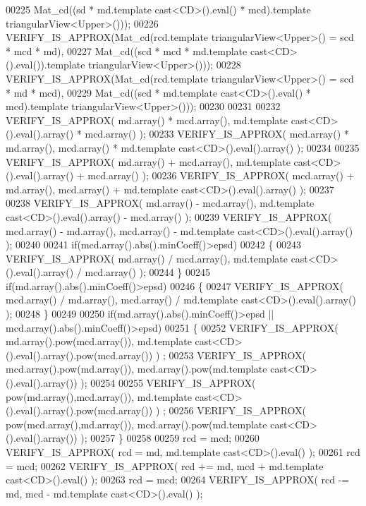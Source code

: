 \begin{DoxyCode}
00225                    Mat\_cd((sd * md.template cast<CD>().eval() * mcd).\textcolor{keyword}{template} triangularView<Upper>()));
00226   VERIFY\_IS\_APPROX(Mat\_cd(rcd.template triangularView<Upper>() = scd * mcd * md),
00227                    Mat\_cd((scd * mcd * md.template cast<CD>().eval()).\textcolor{keyword}{template} triangularView<Upper>()));
00228   VERIFY\_IS\_APPROX(Mat\_cd(rcd.template triangularView<Upper>() = scd * md * mcd),
00229                    Mat\_cd((scd * md.template cast<CD>().eval() * mcd).\textcolor{keyword}{template} triangularView<Upper>()));
00230 
00231 
00232   VERIFY\_IS\_APPROX( md.array()  * mcd.array(), md.template cast<CD>().eval().array() * mcd.array() );
00233   VERIFY\_IS\_APPROX( mcd.array() * md.array(),  mcd.array() * md.template cast<CD>().eval().array() );
00234 
00235   VERIFY\_IS\_APPROX( md.array()  + mcd.array(), md.template cast<CD>().eval().array() + mcd.array() );
00236   VERIFY\_IS\_APPROX( mcd.array() + md.array(),  mcd.array() + md.template cast<CD>().eval().array() );
00237 
00238   VERIFY\_IS\_APPROX( md.array()  - mcd.array(), md.template cast<CD>().eval().array() - mcd.array() );
00239   VERIFY\_IS\_APPROX( mcd.array() - md.array(),  mcd.array() - md.template cast<CD>().eval().array() );
00240 
00241   \textcolor{keywordflow}{if}(mcd.array().abs().minCoeff()>epsd)
00242   \{
00243     VERIFY\_IS\_APPROX( md.array() / mcd.array(), md.template cast<CD>().eval().array() / mcd.array() );
00244   \}
00245   \textcolor{keywordflow}{if}(md.array().abs().minCoeff()>epsd)
00246   \{
00247     VERIFY\_IS\_APPROX( mcd.array() / md.array(), mcd.array() / md.template cast<CD>().eval().array() );
00248   \}
00249 
00250   \textcolor{keywordflow}{if}(md.array().abs().minCoeff()>epsd || mcd.array().abs().minCoeff()>epsd)
00251   \{
00252     VERIFY\_IS\_APPROX( md.array().pow(mcd.array()), md.template cast<CD>().eval().array().pow(mcd.array()) )
      ;
00253     VERIFY\_IS\_APPROX( mcd.array().pow(md.array()),  mcd.array().pow(md.template cast<CD>().eval().array()) 
      );
00254 
00255     VERIFY\_IS\_APPROX( pow(md.array(),mcd.array()), md.template cast<CD>().eval().array().pow(mcd.array()) )
      ;
00256     VERIFY\_IS\_APPROX( pow(mcd.array(),md.array()),  mcd.array().pow(md.template cast<CD>().eval().array()) 
      );
00257   \}
00258 
00259   rcd = mcd;
00260   VERIFY\_IS\_APPROX( rcd = md, md.template cast<CD>().eval() );
00261   rcd = mcd;
00262   VERIFY\_IS\_APPROX( rcd += md, mcd + md.template cast<CD>().eval() );
00263   rcd = mcd;
00264   VERIFY\_IS\_APPROX( rcd -= md, mcd - md.template cast<CD>().eval() );

\end{DoxyCode}

